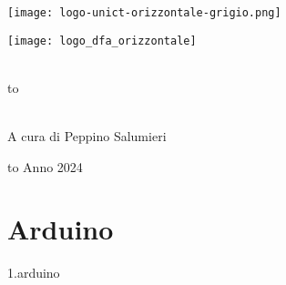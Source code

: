 \documentclass[12pt]{book}
\newcommand\blankpage{%
    \null
    \thispagestyle{empty}%
    \newpage} %
\newcommand{\comment}[1]{}
\begin{document}
\thispagestyle{empty}
\begin{center}

\begin{minipage}[c]{0.45\textwidth}
\begin{flushleft}
\texttt{[image: logo-unict-orizzontale-grigio.png]}
\end{flushleft}
\end{minipage}
\hfill
\begin{minipage}[c]{0.45\textwidth}
\begin{flushright}
\texttt{[image: logo\_dfa\_orizzontale]}
\end{flushright}
\end{minipage}\\
\medskip
\hbox to \textwidth{\hrulefill}

\vfill
\vfill

\uppercase{}\\

\vfill
\large{A cura di Peppino Salumieri}

\vfill
\vfill
\hbox to \textwidth{\hrulefill}
{\sc Anno 2024}
\end{center}

\afterpage{\blankpage}
\newpage

\clearpage                       %
{                                %
  \pagestyle{empty}              %
  {
    \fancyhf{}%
    \renewcommand{\headrulewidth}{0pt}%
    \renewcommand{\footrulewidth}{0pt}%
  }
  \tableofcontents
  \thispagestyle{empty}          %
} %

\newpage

\pagestyle{fancy}
\fancyhf{}
\fancyhead[LE]{\nouppercase{\textbf{\thepage}\hfill\leftmark}}
\fancyhead[RO]{\nouppercase{\rightmark\hfill\textbf{\thepage}}}


\chapter{Arduino}
{1.arduino}
\end{document}
